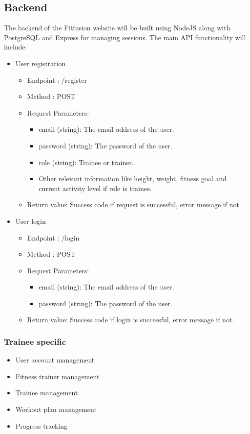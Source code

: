 \documentclass{article}
\begin{document}
\subsection{Backend}
The backend of the Fitfusion website will be built using NodeJS along with PostgreSQL and Express for managing sessions. The main API functionality will include:

\begin{itemize}
\item User registration
    \begin{itemize} 
        \item Endpoint : /register
        \item Method : POST
        \item Request Parameters:
            \begin{itemize}
                \item email (string): The email address of the user.
                \item password (string): The password of the user.
                \item role (string): Trainee or trainer.
                \item Other relevant information like height, weight, fitness goal and current activity level if role is trainee.
            \end{itemize}
        \item Return value: Success code if request is successful, error message if not.
    \end{itemize}
\item User login
    \begin{itemize}
        \item Endpoint : /login
        \item Method : POST
        \item Request Parameters:
            \begin{itemize}
                \item email (string): The email address of the user.
                \item password (string): The password of the user.
        \end{itemize}
        \item Return value: Success code if login is successful, error message if not.
    \end{itemize}
\end{itemize}

\subsubsection*{Trainee specific}
\begin{itemize}

\item User account management
\item Fitness trainer management
\item Trainee management
\item Workout plan management
\item Progress tracking
\end{itemize}
\end{document}
